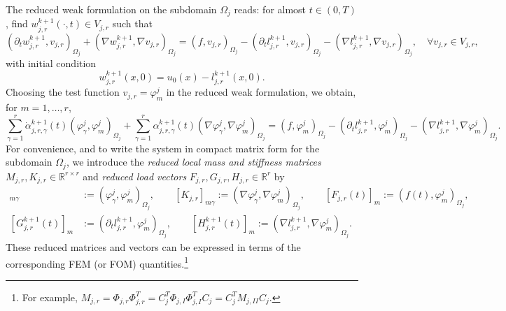 \documentclass[a4paper, 11pt]{article}
\theoremstyle{remark}
\begin{document}
\noindent The reduced weak formulation on the subdomain $\Omega_{j}$ reads: for almost $t\in (0, T)$, find $w^{k+1}_{j, r}(\cdot, t)\in V_{j, r}$ such that
\begin{equation*}
    \left(\partial_{t} w_{j, r}^{k+1}, v_{j, r}\right)_{\Omega_{j}} + \left(\nabla w_{j, r}^{k+1}, \nabla v_{j, r}\right)_{\Omega_{j}} = \left(f, v_{j, r}\right)_{\Omega_{j}} - \left(\partial_{t} l_{j, r}^{k+1}, v_{j, r}\right)_{\Omega_{j}} - \left(\nabla l_{j, r}^{k+1}, \nabla v_{j, r}\right)_{\Omega_{j}}, \quad\forall v_{j, r}\in V_{j, r},
\end{equation*}
with initial condition
\begin{equation*}
    w_{j, r}^{k+1}(x, 0) = u_{0}(x) - l_{j, r}^{k+1}(x, 0).
\end{equation*}
Choosing the test function $v_{j, r} = \varphi^{j}_{m}$ in the reduced weak formulation, we obtain, for $m = 1, \ldots, r$,
\begin{equation*}
    \sum_{\gamma=1}^{r}\dot{\alpha}_{j, r, \gamma}^{k+1}(t)\left(\varphi^{j}_{\gamma}, \varphi^{j}_{m}\right)_{\Omega_{j}} + \sum_{\gamma=1}^{r}\alpha_{j, r, \gamma}^{k+1}(t)\left(\nabla \varphi^{j}_{\gamma}, \nabla \varphi^{j}_{m}\right)_{\Omega_{j}} = \left(f, \varphi_{m}^{j}\right)_{\Omega_{j}} - \left(\partial_{t} l_{j, r}^{k+1}, \varphi_{m}^{j}\right)_{\Omega_{j}} - \left(\nabla l_{j, r}^{k+1}, \nabla \varphi_{m}^{j}\right)_{\Omega_{j}}.
\end{equation*}
For convenience, and to write the system in compact matrix form for the subdomain $\Omega_j$, we introduce the \textit{reduced local mass and stiffness matrices} $M_{j, r}, K_{j, r}\in \mathbb{R}^{r\times r}$ and \textit{reduced load vectors} $F_{j, r}, G_{j, r}, H_{j, r}\in \mathbb{R}^{r}$ by
\begin{align*}
    [M_{j, r}]_{m\gamma} &:= (\varphi_{\gamma}^{j}, \varphi_{m}^{j})_{\Omega_j}, \qquad [K_{j, r}]_{m\gamma} := (\nabla \varphi_{\gamma}^{j}, \nabla \varphi_{m}^{j})_{\Omega_j}, \qquad [F_{j, r}(t)]_{m} := (f(t), \varphi_{m}^{j})_{\Omega_j}, \\
    [G^{k+1}_{j, r}(t)]_m &:= (\partial_t l_{j, r}^{k+1}, \varphi_{m}^{j})_{\Omega_j}, \qquad
    [H^{k+1}_{j, r}(t)]_m := (\nabla l_{j, r}^{k+1}, \nabla \varphi_{m}^{j})_{\Omega_j}.
\end{align*}
These reduced matrices and vectors can be expressed in terms of the corresponding FEM (or FOM) quantities.\footnote{For example, $M_{j,r} = \Phi_{j, r}\Phi_{j, r}^{T} = C_{j}^{T}\Phi_{j, I}\Phi_{j, I}^{T}C_{j} = C_{j}^{T}M_{j, II}C_{j}.$}
\end{document}
